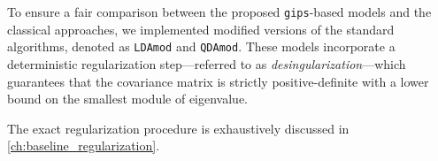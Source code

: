 \documentclass[a4paper,11pt,twoside]{report}
\theoremstyle{definition}
\begin{document}
To ensure a fair comparison between the proposed \texttt{gips}-based models and the classical approaches, we implemented modified versions of the standard algorithms, denoted as \texttt{LDAmod} and \texttt{QDAmod}. These models incorporate a deterministic regularization step—referred to as \textit{desingularization}—which guarantees that the covariance matrix is strictly positive-definite with a lower bound on the smallest module of eigenvalue.

The exact regularization procedure is exhaustively discussed in \autoref{ch:baseline_regularization}.
%
%
%
%
%
%
%
\end{document}
